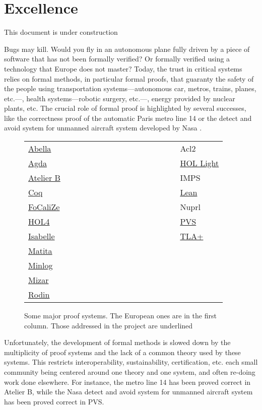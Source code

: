 \documentclass[12pt]{book}
\begin{document}
\chapter{Excellence}

{\Huge \color{red} This document is under construction}

Bugs may kill. Would you fly in an autonomous plane fully driven by a
piece of software that has not been formally verified?  Or formally
verified using a technology that Europe does not master? Today, the
trust in critical systems relies on formal methods, in particular
formal proofs, that guaranty the safety of the people using
transportation systems---autonomous car, metros, trains, planes,
etc.---, health systems---robotic surgery, etc.---, energy provided by
nuclear plants, etc. The crucial role of formal proof is highlighted
by several successes, like the correctness proof of the automatic
Paris metro line 14 \cite{metro14} or the detect and avoid system for
unmanned aircraft system developed by Nasa \cite{Munoz16}.

\thispagestyle{empty}

\begin{figure}
\begin{tabular}{ll}
  {\sc \underline{Abella}}~~~~~~~~~~~~~~~~~~~~~~~~~~~~~~&{\sc Acl2}\\
{\sc \underline{Agda}} &  {\sc \underline{HOL Light}}\\
{\sc \underline{Atelier B}} &  {\sc IMPS}\\
{\sc \underline{Coq}}  &  {\sc \underline{Lean}}\\
{\sc \underline{FoCaliZe}}  &  {\sc Nuprl}\\
{\sc \underline{HOL4}}  &  {\sc \underline{PVS}}\\
{\sc \underline{Isabelle}}  &  {\sc \underline{TLA+}}\\
{\sc \underline{Matita}}\\
{\sc \underline{Minlog}}\\
{\sc \underline{Mizar}}\\
{\sc \underline{Rodin}}\\
\end{tabular}
\caption{Some major proof systems. The European ones are in the first column.
  Those addressed in the project are underlined\label{systems}}
\end{figure}

Unfortunately, the development of formal methods is slowed down by the
multiplicity of proof systems and the lack of a common theory used by
these systems. This restricts interoperability, sustainability,
certification, etc.  each small community being centered around one
theory and one system, and often re-doing work done elsewhere.  For
instance, the metro line 14 has been proved correct in {\sc Atelier
B}, while the Nasa detect and avoid system for unmanned aircraft
system has been proved correct in {\sc PVS}.
\end{document}
